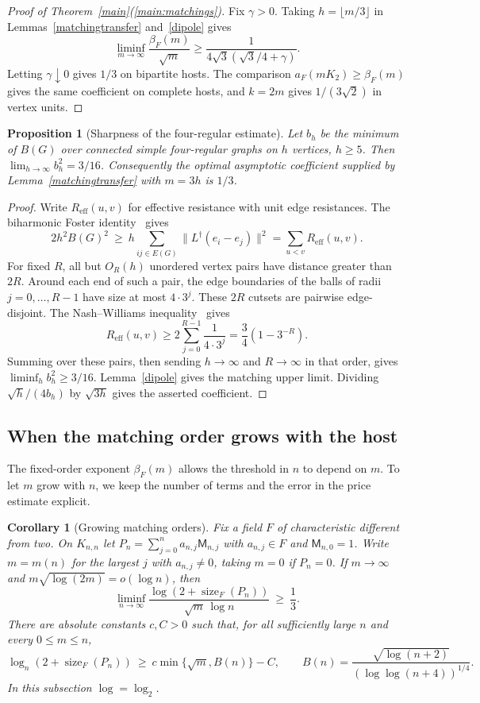 \documentclass[11pt]{article}
\newtheorem{proposition}[theorem]{Proposition}
\newtheorem{corollary}[theorem]{Corollary}
\theoremstyle{remark}
\newcommand{\Match}{\mathsf M}
\newcommand{\sizeF}{\operatorname{size}_F}
\begin{document}
\begin{proof}[Proof of Theorem~\ref{main}(\ref{main:matchings})]
Fix $\gamma>0$. Taking $h=\lfloor m/3\rfloor$ in Lemmas~\ref{matchingtransfer} and~\ref{dipole} gives
\[
 \liminf_{m\to\infty}\frac{\beta_F(m)}{\sqrt m}
   \ge \frac{1}{4\sqrt3(\sqrt3/4+\gamma)}.
\]
Letting $\gamma\downarrow0$ gives $1/3$ on bipartite hosts. The comparison $a_F(mK_2)\ge\beta_F(m)$ gives the same coefficient on complete hosts, and $k=2m$ gives $1/(3\sqrt2)$ in vertex units.
\end{proof}

\begin{proposition}[Sharpness of the four-regular estimate]\label{sharpdipole}
Let $b_h$ be the minimum of $B(G)$ over connected simple four-regular graphs on $h$ vertices, $h\ge5$. Then $\lim_{h\to\infty} b_h^2=3/16$. Consequently the optimal asymptotic coefficient supplied by Lemma~\ref{matchingtransfer} with $m=3h$ is $1/3$.
\end{proposition}
\begin{proof}
Write $R_{\mathrm{eff}}(u,v)$ for effective resistance with unit edge resistances. The biharmonic Foster identity~\cite[Corollary~4.3]{biharmonic} gives
\[
 2h^2 B(G)^2\ \ge\ h\sum_{ij\in E(G)}\|L^\dagger(e_i-e_j)\|^2
    =\sum_{u<v}R_{\mathrm{eff}}(u,v).
\]
For fixed $R$, all but $O_R(h)$ unordered vertex pairs have distance greater than $2R$. Around each end of such a pair, the edge boundaries of the balls of radii $j=0,\ldots,R-1$ have size at most $4\cdot3^j$. These $2R$ cutsets are pairwise edge-disjoint. The Nash--Williams inequality~\cite{nash} gives
\[
 R_{\mathrm{eff}}(u,v)\ge 2\sum_{j=0}^{R-1}\frac{1}{4\cdot3^j}
                  =\frac34(1-3^{-R}).
\]
Summing over these pairs, then sending $h\to\infty$ and $R\to\infty$ in that order, gives $\liminf_h b_h^2\ge3/16$. Lemma~\ref{dipole} gives the matching upper limit. Dividing $\sqrt h/(4b_h)$ by $\sqrt{3h}$ gives the asserted coefficient.
\end{proof}

\subsection{When the matching order grows with the host}\label{growing-matchings}
The fixed-order exponent $\beta_F(m)$ allows the threshold in $n$ to depend on $m$.
To let $m$ grow with $n$, we keep the number of terms and the error in the price estimate explicit.

\begin{corollary}[Growing matching orders]\label{growing-bound}
Fix a field $F$ of characteristic different from two. On $K_{n,n}$ let
$P_n=\sum_{j=0}^n a_{n,j}\Match_{n,j}$ with $a_{n,j}\in F$ and $\Match_{n,0}=1$.
Write $m=m(n)$ for the largest $j$ with $a_{n,j}\ne0$, taking $m=0$ if $P_n=0$.
If $m\to\infty$ and $m\sqrt{\log(2m)}=o(\log n)$, then
\[
 \liminf_{n\to\infty}\frac{\log(2+\sizeF(P_n))}{\sqrt m\,\log n}\ \ge\ \frac13 .
\]
There are absolute constants $c,C>0$ such that, for all sufficiently large $n$ and every $0\le m\le n$,
\[
 \log_n(2+\sizeF(P_n))\ \ge\ c\min\{\sqrt m,B(n)\}-C,\qquad
 B(n)=\frac{\sqrt{\log(n+2)}}{(\log\log(n+4))^{1/4}} .
\]
In this subsection $\log=\log_2$.
\end{corollary}
\end{document}
